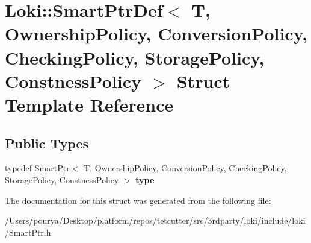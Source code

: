\hypertarget{structLoki_1_1SmartPtrDef}{}\section{Loki\+:\+:Smart\+Ptr\+Def$<$ T, Ownership\+Policy, Conversion\+Policy, Checking\+Policy, Storage\+Policy, Constness\+Policy $>$ Struct Template Reference}
\label{structLoki_1_1SmartPtrDef}
\subsection*{Public Types}
\begin{DoxyCompactItemize}
\item 
\hypertarget{structLoki_1_1SmartPtrDef_a294de36ce6340d4dee3e42f15ba03377}{}typedef \hyperlink{classLoki_1_1SmartPtr}{Smart\+Ptr}$<$ T, Ownership\+Policy, Conversion\+Policy, Checking\+Policy, Storage\+Policy, Constness\+Policy $>$ {\bfseries type}\label{structLoki_1_1SmartPtrDef_a294de36ce6340d4dee3e42f15ba03377}

\end{DoxyCompactItemize}


The documentation for this struct was generated from the following file\+:\begin{DoxyCompactItemize}
\item 
/\+Users/pourya/\+Desktop/platform/repos/tetcutter/src/3rdparty/loki/include/loki/Smart\+Ptr.\+h\end{DoxyCompactItemize}
